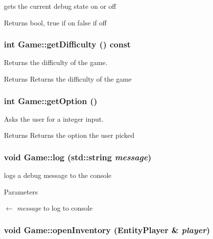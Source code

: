 gets the current debug state on or off \begin{DoxyReturn}{Returns}
bool, true if on false if off 
\end{DoxyReturn}
\hypertarget{classGame_aa52fc612f751e30daeacc15661472628}{
\subsubsection[{getDifficulty}]{\setlength{\rightskip}{0pt plus 5cm}int Game::getDifficulty () const}}
\label{classGame_aa52fc612f751e30daeacc15661472628}


Returns the difficulty of the game. \begin{DoxyReturn}{Returns}
Returns the difficulty of the game 
\end{DoxyReturn}
\hypertarget{classGame_a91643d2e9ede2dfa552339db06ff52bf}{
\subsubsection[{getOption}]{\setlength{\rightskip}{0pt plus 5cm}int Game::getOption ()}}
\label{classGame_a91643d2e9ede2dfa552339db06ff52bf}


Asks the user for a integer input. \begin{DoxyReturn}{Returns}
Returns the option the user picked 
\end{DoxyReturn}
\hypertarget{classGame_a090e1f20d57b782a93b5b61c8b6f15b8}{
\subsubsection[{log}]{\setlength{\rightskip}{0pt plus 5cm}void Game::log (std::string {\em message})}}
\label{classGame_a090e1f20d57b782a93b5b61c8b6f15b8}


logs a debug message to the console 
\begin{DoxyParams}{Parameters}
\item[\mbox{$\leftarrow$} {\em message}]to log to console \end{DoxyParams}
\hypertarget{classGame_a51c860f2a6051188585946859efa2967}{
\subsubsection[{openInventory}]{\setlength{\rightskip}{0pt plus 5cm}void Game::openInventory ({\bf EntityPlayer} \& {\em player})}}
\label{classGame_a51c860f2a6051188585946859efa2967}


